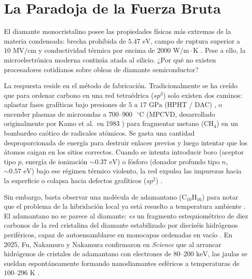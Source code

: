 \documentclass[10pt,twocolumn,a4paper]{article}
\begin{document}
\section{La Paradoja de la Fuerza Bruta}
El diamante monocristalino posee las propiedades físicas más extremas de la materia condensada: brecha prohibida de $5.47\text{ eV}$, campo de ruptura superior a $10\text{ MV/cm}$ y conductividad térmica por encima de $2000\text{ W/m}\cdot\text{K}$ \cite{Koizumi2001}. Pese a ello, la microelectrónica moderna continúa atada al silicio. ¿Por qué no existen procesadores cotidianos sobre obleas de diamante semiconductor?

La respuesta reside en el método de fabricación. Tradicionalmente se ha creído que para ordenar carbono en una red tetraédrica ($sp^3$) solo existen dos caminos: aplastar fases grafíticas bajo presiones de $5\text{ a }17\text{ GPa}$ (HPHT / DAC) \cite{Suzuki2024}, o encender plasmas de microondas a $700\text{--}900\text{ }^\circ\text{C}$ (MPCVD, desarrollado originalmente por Kamo et al.\ en 1983 \cite{Kamo1983}) para fragmentar metano ($\text{CH}_4$) en un bombardeo caótico de radicales atómicos. Se gasta una cantidad desproporcionada de energía para destruir enlaces previos y luego intentar que los átomos caigan en los sitios correctos. Cuando se intenta introducir boro (aceptor tipo $p$, energía de ionización $\sim 0.37\text{ eV}$) o fósforo (donador profundo tipo $n$, $\sim 0.57\text{ eV}$) bajo ese régimen térmico violento, la red expulsa las impurezas hacia la superficie o colapsa hacia defectos grafíticos ($sp^2$) \cite{Koizumi2001}.

Sin embargo, basta observar una molécula de adamantano ($\text{C}_{10}\text{H}_{16}$) para notar que el problema de la hibridación local ya está resuelto a temperatura ambiente \cite{Schleyer1957,Dahl2003}. El adamantano no se parece al diamante: \textit{es} un fragmento estequiométrico de diez carbonos de la red cristalina del diamante estabilizado por dieciséis hidrógenos periféricos, capaz de autoensamblarse en monocapas ordenadas en vacío \cite{Yang2007}. En 2025, Fu, Nakamuro y Nakamura confirmaron en \textit{Science} que al arrancar hidrógenos de cristales de adamantano con electrones de $80\text{--}200\text{ keV}$, las jaulas se sueldan espontáneamente formando nanodiamantes esféricos a temperaturas de $100\text{--}296\text{ K}$ \cite{Fu2025}.
\end{document}
